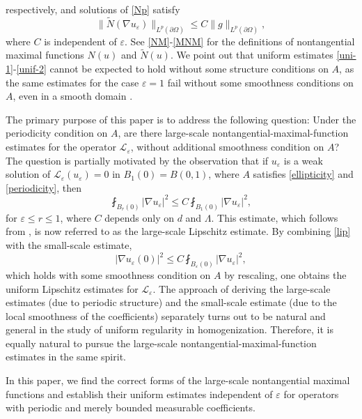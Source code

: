 \documentclass[reqno,12pt]{amsart} %
\theoremstyle{definition}
\theoremstyle{remark}
\numberwithin{equation}{section}
\newcommand{\cL}{\mathcal{L}}
\newcommand{\e}{\varepsilon}
\begin{document}
respectively, and solutions of \eqref{Np} satisfy 
\begin{equation}\label{unif-2}
\| \widetilde{N} (\nabla u_\e)\|_{L^p(\partial\Omega)}
\le C \| g \|_{L^p(\partial\Omega)},
\end{equation}
where $C$ is independent of $\e$.
See \eqref{NM}-\eqref{MNM} for the definitions of 
nontangential maximal functions $N(u)$ and $\widetilde{N}(u)$.
We point out that uniform estimates \eqref{uni-1}-\eqref{unif-2}
cannot be expected to hold without some structure conditions on $A$,
as the same estimates for the case $\e=1$ fail 
without some smoothness conditions on $A$, even in a smooth domain
\cite{MM-1980, CFK81, K94}.

The primary purpose of this paper is to address the following question: 
Under the periodicity condition on $A$, 
are there large-scale nontangential-maximal-function estimates
for the operator $\cL_\e$,
without additional smoothness condition on $A$?
The question is partially motivated by the observation that if $u_\e$ is a weak solution of $\cL_\e(u_\e)=0$ in $B_1(0)=B(0, 1)$, where $A$ satisfies 
\eqref{ellipticity} and \eqref{periodicity}, then 
\begin{equation}\label{lip}
    \fint_{B_r (0)} |\nabla u_\e|^2
    \le C \fint_{B_1(0)} |\nabla u_\e|^2,
\end{equation}
for $\e\le r\le 1$, 
where $C$ depends only on $d$ and $\Lambda$.
This estimate, which follows from \cite{AL87}, is now referred to as the large-scale Lipschitz estimate.
By combining \eqref{lip} with the small-scale estimate,
$$
|\nabla u_\e (0) |^2
\le C \fint_{B_\e(0)} |\nabla u_\e|^2,
$$
which holds with some smoothness condition  on $A$ by rescaling, one obtains
the uniform  Lipschitz estimates for $\cL_\e$. The approach of deriving the large-scale estimates (due to periodic structure) and the small-scale estimate (due to the local smoothness of the coefficients) separately turns out to be natural and general in the study of uniform regularity in homogenization. Therefore, it is equally natural to pursue the large-scale nontangential-maximal-function estimates in the same spirit.

In this paper, we find the correct forms of the large-scale nontangential maximal functions and establish their uniform estimates independent of $\e$ for operators with periodic and merely bounded measurable coefficients.
\end{document}
